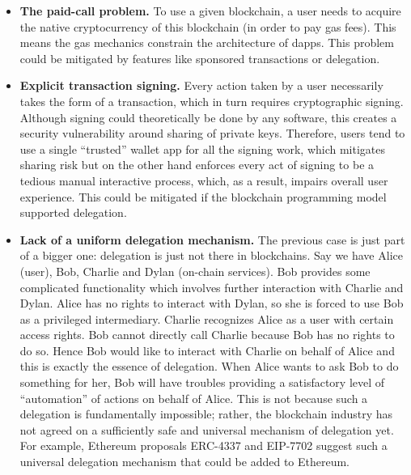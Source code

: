 \documentclass[a4paper]{article}
\begin{document}
\begin{itemize}
  \item \textbf{The paid-call problem.} To use a given blockchain, a user needs to acquire the native cryptocurrency of this blockchain (in order to pay gas fees). This means the gas mechanics constrain the architecture of dapps. This problem could be mitigated by features like sponsored transactions or delegation.
  \item \textbf{Explicit transaction signing.} Every action taken by a user necessarily takes the form of a transaction, which in turn requires cryptographic signing. Although signing could theoretically be done by any software, this creates a security vulnerability around sharing of private keys. Therefore, users tend to use a single ``trusted'' wallet app for all the signing work, which mitigates sharing risk but on the other hand enforces every act of signing to be a tedious manual interactive process, which, as a result, impairs overall user experience. This could be mitigated if the blockchain programming model supported delegation.
  \item \textbf{Lack of a uniform delegation mechanism.} The previous case is just part of a bigger one: delegation is just not there in blockchains. Say we have Alice (user), Bob, Charlie and Dylan (on-chain services). Bob provides some complicated functionality which involves further interaction with Charlie and Dylan. Alice has no rights to interact with Dylan, so she is forced to use Bob as a privileged intermediary. Charlie recognizes Alice as a user with certain access rights. Bob cannot directly call Charlie because Bob has no rights to do so. Hence Bob would like to interact with Charlie on behalf of Alice and this is exactly the essence of delegation. When Alice wants to ask Bob to do something for her, Bob will have troubles providing a satisfactory level of ``automation'' of actions on behalf of Alice. This is not because such a delegation is fundamentally impossible; rather, the blockchain industry has not agreed on a sufficiently safe and universal mechanism of delegation yet. For example, Ethereum proposals ERC-4337 and EIP-7702 suggest such a universal delegation mechanism that could be added to Ethereum.

\end{itemize}
\end{document}
